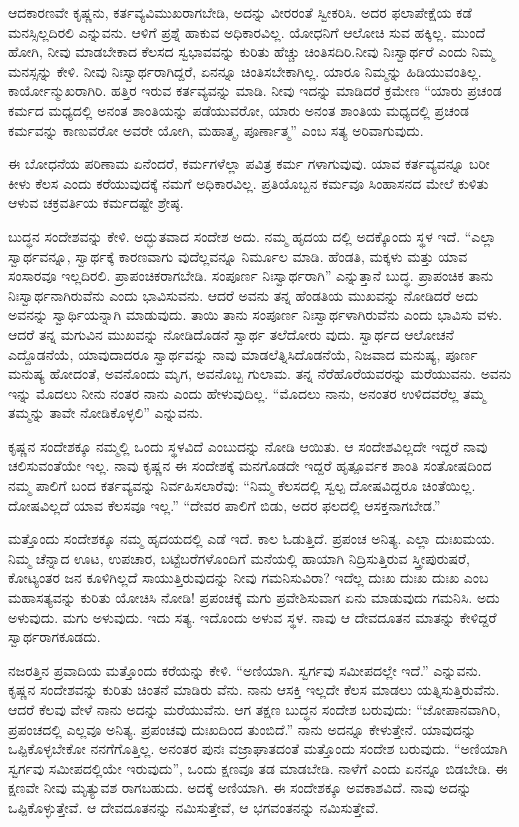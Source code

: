 ಆದಕಾರಣವೇ ಕೃಷ್ಣನು, ಕರ್ತವ್ಯವಿಮುಖರಾಗಬೇಡಿ, ಅದನ್ನು ವೀರರಂತೆ ಸ್ವೀಕರಿಸಿ. ಅದರ ಫಲಾಪೇಕ್ಷೆಯ ಕಡೆ ಮನಸ್ಸಿಲ್ಲದಿರಲಿ ಎನ್ನುವನು. ಆಳಿಗೆ ಪ್ರಶ್ನೆ ಹಾಕುವ ಅಧಿಕಾರವಿಲ್ಲ. ಯೋಧನಿಗೆ ಆಲೋಚಿ ಸುವ ಹಕ್ಕಿಲ್ಲ. ಮುಂದೆ ಹೋಗಿ, ನೀವು ಮಾಡಬೇಕಾದ ಕೆಲಸದ ಸ್ವಭಾವವನ್ನು ಕುರಿತು ಹೆಚ್ಚು ಚಿಂತಿಸದಿರಿ.ನೀವು ನಿಃಸ್ವಾರ್ಥರೆ ಎಂದು ನಿಮ್ಮ ಮನಸ್ಸನ್ನು ಕೇಳಿ. ನೀವು ನಿಃಸ್ವಾರ್ಥರಾಗಿದ್ದರೆ, ಏನನ್ನೂ ಚಿಂತಿಸಬೇಕಾಗಿಲ್ಲ. ಯಾರೂ ನಿಮ್ಮನ್ನು ಹಿಡಿಯುವಂತಿಲ್ಲ. ಕಾರ್ಯೋನ್ಮುಖರಾಗಿರಿ. ಹತ್ತಿರ ಇರುವ ಕರ್ತವ್ಯವನ್ನು ಮಾಡಿ. ನೀವು ಇದನ್ನು ಮಾಡಿದರೆ ಕ್ರಮೇಣ “ಯಾರು ಪ್ರಚಂಡ ಕರ್ಮದ ಮಧ್ಯದಲ್ಲಿ ಅನಂತ ಶಾಂತಿಯನ್ನು ಪಡೆಯುವರೋ, ಯಾರು ಅನಂತ ಶಾಂತಿಯ ಮಧ್ಯದಲ್ಲಿ ಪ್ರಚಂಡ ಕರ್ಮವನ್ನು ಕಾಣುವರೋ ಅವರೇ ಯೋಗಿ, ಮಹಾತ್ಮ, ಪೂರ್ಣಾತ್ಮ” ಎಂಬ ಸತ್ಯ ಅರಿವಾಗುವುದು.

ಈ ಬೋಧನೆಯ ಪರಿಣಾಮ ಏನೆಂದರೆ, ಕರ್ಮಗಳೆಲ್ಲಾ ಪವಿತ್ರ ಕರ್ಮ ಗಳಾಗುವುವು. ಯಾವ ಕರ್ತವ್ಯವನ್ನೂ ಬರೀ ಕೀಳು ಕೆಲಸ ಎಂದು ಕರೆಯುವುದಕ್ಕೆ ನಮಗೆ ಅಧಿಕಾರವಿಲ್ಲ. ಪ್ರತಿಯೊಬ್ಬನ ಕರ್ಮವೂ ಸಿಂಹಾಸನದ ಮೇಲೆ ಕುಳಿತು ಆಳುವ ಚಕ್ರವರ್ತಿಯ ಕರ್ಮದಷ್ಟೇ ಶ್ರೇಷ್ಠ.

ಬುದ್ಧನ ಸಂದೇಶವನ್ನು ಕೇಳಿ. ಅದ್ಭುತವಾದ ಸಂದೇಶ ಅದು. ನಮ್ಮ ಹೃದಯ ದಲ್ಲಿ ಅದಕ್ಕೊಂದು ಸ್ಥಳ ಇದೆ. “ಎಲ್ಲಾ ಸ್ವಾರ್ಥವನ್ನೂ, ಸ್ವಾರ್ಥಕ್ಕೆ ಕಾರಣವಾಗು ವುದೆಲ್ಲವನ್ನೂ ನಿರ್ಮೂಲ ಮಾಡಿ. ಹೆಂಡತಿ, ಮಕ್ಕಳು ಮತ್ತು ಯಾವ ಸಂಸಾರವೂ ಇಲ್ಲದಿರಲಿ. ಪ್ರಾಪಂಚಿಕರಾಗಬೇಡಿ. ಸಂಪೂರ್ಣ ನಿಃಸ್ವಾರ್ಥರಾಗಿ” ಎನ್ನುತ್ತಾನೆ ಬುದ್ಧ. ಪ್ರಾಪಂಚಿಕ ತಾನು ನಿಃಸ್ವಾರ್ಥನಾಗಿರುವೆನು ಎಂದು ಭಾವಿಸುವನು. ಆದರೆ ಅವನು ತನ್ನ ಹೆಂಡತಿಯ ಮುಖವನ್ನು ನೋಡಿದರೆ ಅದು ಅವನನ್ನು ಸ್ವಾರ್ಥಿಯನ್ನಾಗಿ ಮಾಡುವುದು. ತಾಯಿ ತಾನು ಸಂಪೂರ್ಣ ನಿಃಸ್ವಾರ್ಥಳಾಗಿರುವೆನು ಎಂದು ಭಾವಿಸು ವಳು. ಆದರೆ ತನ್ನ ಮಗುವಿನ ಮುಖವನ್ನು ನೋಡಿದೊಡನೆ ಸ್ವಾರ್ಥ ತಲೆದೋರು ವುದು. ಸ್ವಾರ್ಥದ ಆಲೋಚನೆ ಎದ್ದೊಡನೆಯೆ, ಯಾವುದಾದರೂ ಸ್ವಾರ್ಥವನ್ನು ನಾವು ಮಾಡಲೆತ್ನಿಸಿದೊಡನೆಯೆ, ನಿಜವಾದ ಮನುಷ್ಯ, ಪೂರ್ಣ ಮನುಷ್ಯ ಹೋದಂತೆ, ಅವನೊಂದು ಮೃಗ, ಅವನೊಬ್ಬ ಗುಲಾಮ. ತನ್ನ ನೆರೆಹೊರೆಯವರನ್ನು ಮರೆಯುವನು. ಅವನು ಇನ್ನು ಮೊದಲು ನೀನು ನಂತರ ನಾನು ಎಂದು ಹೇಳುವುದಿಲ್ಲ. “ಮೊದಲು ನಾನು, ಅನಂತರ ಉಳಿದವರೆಲ್ಲ ತಮ್ಮ ತಮ್ಮನ್ನು ತಾವೇ ನೋಡಿಕೊಳ್ಳಲಿ” ಎನ್ನುವನು.

ಕೃಷ್ಣನ ಸಂದೇಶಕ್ಕೂ ನಮ್ಮಲ್ಲಿ ಒಂದು ಸ್ಥಳವಿದೆ ಎಂಬುದನ್ನು ನೋಡಿ ಆಯಿತು. ಆ ಸಂದೇಶವಿಲ್ಲದೇ ಇದ್ದರೆ ನಾವು ಚಲಿಸುವಂತೆಯೇ ಇಲ್ಲ. ನಾವು ಕೃಷ್ಣನ ಈ ಸಂದೇಶಕ್ಕೆ ಮನಗೊಡದೇ ಇದ್ದರೆ ಹೃತ್ಪೂರ್ವಕ ಶಾಂತಿ ಸಂತೋಷದಿಂದ ನಮ್ಮ ಪಾಲಿಗೆ ಬಂದ ಕರ್ತವ್ಯವನ್ನು ನಿರ್ವಹಿಸಲಾರೆವು: “ನಿಮ್ಮ ಕೆಲಸದಲ್ಲಿ ಸ್ವಲ್ಪ ದೋಷವಿದ್ದರೂ ಚಿಂತೆಯಿಲ್ಲ. ದೋಷವಿಲ್ಲದೆ ಯಾವ ಕೆಲಸವೂ ಇಲ್ಲ.” “ದೇವರ ಪಾಲಿಗೆ ಬಿಡು, ಅದರ ಫಲದಲ್ಲಿ ಆಸಕ್ತನಾಗಬೇಡ.”

ಮತ್ತೊಂದು ಸಂದೇಶಕ್ಕೂ ನಮ್ಮ ಹೃದಯದಲ್ಲಿ ಎಡೆ ಇದೆ. ಕಾಲ ಓಡುತ್ತಿದೆ. ಪ್ರಪಂಚ ಅನಿತ್ಯ. ಎಲ್ಲಾ ದುಃಖಮಯ. ನಿಮ್ಮ ಚೆನ್ನಾದ ಊಟ, ಉಪಚಾರ, ಬಟ್ಟೆಬರೆಗಳೊಂದಿಗೆ ಮನೆಯಲ್ಲಿ ಹಾಯಾಗಿ ನಿದ್ರಿಸುತ್ತಿರುವ ಸ್ತ್ರೀಪುರುಷರೆ, ಕೋಟ್ಯಂತರ ಜನ ಕೂಳಿಗಿಲ್ಲದೆ ಸಾಯುತ್ತಿರುವುದನ್ನು ನೀವು ಗಮನಿಸುವಿರಾ? ಇದೆಲ್ಲ ದುಃಖ ದುಃಖ ದುಃಖ ಎಂಬ ಮಹಾಸತ್ಯವನ್ನು ಕುರಿತು ಯೋಚಿಸಿ ನೋಡಿ! ಪ್ರಪಂಚಕ್ಕೆ ಮಗು ಪ್ರವೇಶಿಸುವಾಗ ಏನು ಮಾಡುವುದು ಗಮನಿಸಿ. ಅದು ಅಳುವುದು. ಮಗು ಅಳುವುದು. ಇದು ಸತ್ಯ. ಇದೊಂದು ಅಳುವ ಸ್ಥಳ. ನಾವು ಆ ದೇವದೂತನ ಮಾತನ್ನು ಕೇಳಿದ್ದರೆ ಸ್ವಾರ್ಥರಾಗಕೂಡದು.

ನಜರತ್ತಿನ ಪ್ರವಾದಿಯ ಮತ್ತೊಂದು ಕರೆಯನ್ನು ಕೇಳಿ. “ಅಣಿಯಾಗಿ. ಸ್ವರ್ಗವು ಸಮೀಪದಲ್ಲೇ ಇದೆ.” ಎನ್ನುವನು. ಕೃಷ್ಣನ ಸಂದೇಶವನ್ನು ಕುರಿತು ಚಿಂತನೆ ಮಾಡಿರು ವೆನು. ನಾನು ಆಸಕ್ತಿ ಇಲ್ಲದೇ ಕೆಲಸ ಮಾಡಲು ಯತ್ನಿಸುತ್ತಿರುವೆನು. ಆದರೆ ಕೆಲವು ವೇಳೆ ನಾನು ಅದನ್ನು ಮರೆಯುವೆನು. ಆಗ ತಕ್ಷಣ ಬುದ್ಧನ ಸಂದೇಶ ಬರುವುದು: “ಜೋಪಾನವಾಗಿರಿ, ಪ್ರಪಂಚದಲ್ಲಿ ಎಲ್ಲವೂ ಅನಿತ್ಯ. ಪ್ರಪಂಚವು ದುಃಖದಿಂದ ತುಂಬಿದೆ.” ನಾನು ಅದನ್ನೂ ಕೇಳುತ್ತೇನೆ. ಯಾವುದನ್ನು ಒಪ್ಪಿಕೊಳ್ಳಬೇಕೋ ನನಗೆಗೊತ್ತಿಲ್ಲ. ಅನಂತರ ಪುನಃ ವಜ್ರಾಘಾತದಂತೆ ಮತ್ತೊಂದು ಸಂದೇಶ ಬರುವುದು. “ಅಣಿಯಾಗಿ ಸ್ವರ್ಗವು ಸಮೀಪದಲ್ಲಿಯೇ ಇರುವುದು”, ಒಂದು ಕ್ಷಣವೂ ತಡ ಮಾಡಬೇಡಿ. ನಾಳೆಗೆ ಎಂದು ಏನನ್ನೂ ಬಿಡಬೇಡಿ. ಈ ಕ್ಷಣವೇ ನೀವು ಮೃತ್ಯುವಶ ರಾಗಬಹುದು. ಅದಕ್ಕೆ ಅಣಿಯಾಗಿ. ಈ ಸಂದೇಶಕ್ಕೂ ಅವಕಾಶವಿದೆ. ನಾವು ಅದನ್ನು ಒಪ್ಪಿಕೊಳ್ಳುತ್ತೇವೆ. ಆ ದೇವದೂತನನ್ನು ನಮಿಸುತ್ತೇವೆ, ಆ ಭಗವಂತನನ್ನು ನಮಿಸುತ್ತೇವೆ.

